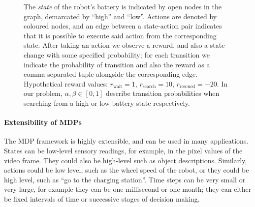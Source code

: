 \documentclass[12pt]{article}
\begin{document}
\begin{figure}[h]
  \centering
  \caption{\footnotesize The \emph{state} of the robot's battery is indicated by open nodes in the graph, demarcated by ``high'' and ``low''. Actions are denoted by coloured nodes, and an edge between a state-action pair indicates that it is possible to execute said action from the corresponding state. After taking an action we observe a reward, and also a state change with some specified probability; for each transition we indicate the probability of transition and also the reward as a comma separated tuple alongside the corresponding edge. Hypothetical reward values: $r_{\textrm{wait}} = 1$, $r_{\textrm{search}} = 10$, $r_{\textrm{rescued}} = -20$. In our problem, $\alpha, \beta \in [0,1]$ describe transition probabilities when searching from a high or low battery state respectively.}
\label{fig: mdprobotrecycler}
\end{figure}

\paragraph{Extensibility of MDPs}
The MDP framework is highly extensible, and can be used in many applications. States can be low-level sensory readings, for example, in the pixel values of the video frame. They could also be high-level such as object descriptions. Similarly, actions could be low level, such as the wheel speed of the robot, or they could be high level, such as ``go to the charging station''. Time steps can be very small or very large, for example they can be one millisecond or one month; they can either be fixed intervals of time or successive stages of decision making.
\end{document}
